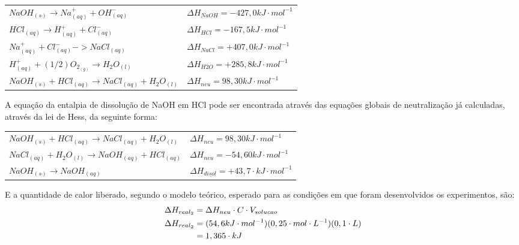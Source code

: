             \begin{table}[h]
            	\centering
            	\renewcommand{\arraystretch}{2}
                \begin{tabular}{ll}
        			$NaOH_{(s)} \rightarrow Na^{+}_{(aq)} + OH^{-}_{(aq)}$ & $\Delta H_{NaOH} = -427,0 kJ \cdot mol^{-1}$ \\
                    $HCl_{(aq)} \rightarrow H^{+}_{(aq)} + Cl^{-}_{(aq)}$ & $\Delta H_{HCl} = -167,5 kJ \cdot mol^{-1}$ \\
                    $Na^{+}_{(aq)} + Cl^{-}_{(aq)} -> NaCl_{(aq)}$ & $\Delta H_{NaCl} = +407,0 kJ \cdot mol^{-1}$ \\
                    $H^{+}_{(aq)} + (1/2) O_{2}_{(g)} \rightarrow H_{2}O_{(l)}$  & $\Delta H_{H2O} = +285,8 kJ \cdot mol^{-1}$\\
                    \hline
                    $NaOH_{(s)} + HCl_{(aq)} \rightarrow NaCl_{(aq)} + H_{2}O_{(l)}$ & $\Delta H_{neu} =  98,30 kJ \cdot mol^{-1}$ \\

				\end{tabular}\label{tab:table4}
            \end{table}
        
            \indent A equação da entalpia de dissolução de NaOH em HCl pode ser encontrada através das equações globais de neutralização já calculadas, através da lei de Hess, da seguinte forma:\\

            \begin{table}[h]
                \centering
                \renewcommand{\arraystretch}{2}
                \begin{tabular}{ll}
                    $NaOH_{(s)} + HCl_{(aq)} \rightarrow NaCl_{(aq)} + H_{2}O_{(l)}$ & $\Delta H_{neu} =  98,30 kJ \cdot mol^{-1}$ \\
                    $NaCl_{(aq)} + H_{2}O_{(l)} \rightarrow NaOH_{(aq)} + HCl_{(aq)}$ & $\Delta H_{neu} = -54,60 kJ \cdot mol^{-1}$ \\
                    \hline
                    $NaOH_{(s)} \rightarrow NaOH_{(aq)}$ & $\Delta H_{disol} = +43,7 \cdot kJ \cdot mol^{-1}$
                \end{tabular}
            \end{table}

        	\indent E a quantidade de calor liberado, segundo o modelo teórico, esperado para as condições em que foram desenvolvidos os experimentos, são:\\
        	\begin{equation}
        		\begin{split}
        			\notag
        			\Delta{H_{real_2}} &= \Delta{H_{neu}} \cdot C \cdot V_{solucao}\\
        			\Delta{H_{real_2}} &=(54,6 kJ \cdot mol^{-1}) (0,25 \cdot mol \cdot L^{-1})(0,1 \cdot L) \\
        			&= 1,365 \cdot kJ\\
        		\end{split}
        	\end{equation}\\
        	
